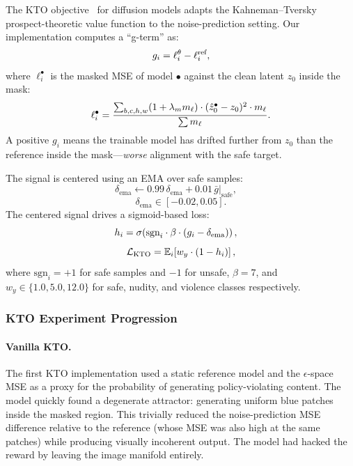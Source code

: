 The KTO objective~\cite{ethayarajh2024ktomodelalignmentprospect} for diffusion models \cite{li2024diffusion_kto} adapts the
Kahneman--Tversky prospect-theoretic value function to the noise-prediction setting.
Our implementation computes a ``g-term'' as:
\begin{equation}
  g_i = \ell^\theta_i - \ell^\text{ref}_i, \notag
  \label{eq:kto_gterm}
\end{equation}
where $\ell^\bullet_i$ is the masked MSE of model $\bullet$ against the
clean latent $z_0$ inside the mask:
\begin{equation}
  \ell^\bullet_i
  = \frac{\sum_{b,c,h,w} (1 + \lambda_m m_\ell) \cdot
      (\hat{z}_0^\bullet - z_0)^2 \cdot m_\ell}
    {\sum m_\ell}. \notag
  \label{eq:masked_mse}
\end{equation}
A positive $g_i$ means the trainable model has drifted further from $z_0$
than the reference inside the mask---\emph{worse} alignment with the safe target.

The signal is centered using an EMA over safe samples:
\[
  \delta_\text{ema} \leftarrow 0.99\,\delta_\text{ema}
    + 0.01\,\bar{g}|_{\text{safe}},
  \quad \label{eq:kto_ema}
\]
\[
  \delta_\text{ema} \in [-0.02, 0.05].
\]
The centered signal drives a sigmoid-based loss:
\begin{equation}
  h_i = \sigma\!\left(\text{sgn}_i \cdot \beta \cdot (g_i - \delta_\text{ema})\right),
  \quad \notag
  \end{equation}
  \begin{equation}
  \mathcal{L}_\text{KTO} = \mathbb{E}_i\!\left[w_y \cdot (1 - h_i)\right], \notag
  \label{eq:kto_loss}
\end{equation}
where $\text{sgn}_i = +1$ for safe samples and $-1$ for unsafe,
$\beta = 7$, and $w_y \in \{1.0, 5.0, 12.0\}$ for safe, nudity, and
violence classes respectively.

\subsubsection{KTO Experiment Progression}

\paragraph{Vanilla KTO.}
The first KTO implementation used a static reference model and the
$\epsilon$-space MSE as a proxy for the probability of generating
policy-violating content.
The model quickly found a degenerate attractor: generating uniform blue
patches inside the masked region.
This trivially reduced the noise-prediction MSE difference relative to the
reference (whose MSE was also high at the same patches) while producing
visually incoherent output.
The model had hacked the reward by leaving the image manifold entirely.

